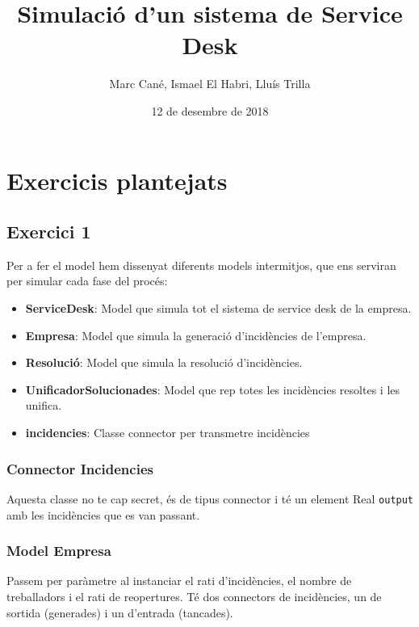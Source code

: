 \documentclass[11pt,a4paper,twoside]{report}
\begin{document}
\title{Simulació d'un sistema de Service Desk}
\author{Marc Cané, Ismael El Habri, Lluís Trilla}
\date{12 de desembre de 2018}
\maketitle

\tableofcontents

\chapter{Exercicis plantejats}

\section{Exercici 1}

Per a fer el model hem dissenyat diferents models intermitjos, que ens serviran per simular cada fase del procés:
\begin{itemize}
  \item \textbf{ServiceDesk}: Model que simula tot el sistema de service desk de la empresa.
  \item \textbf{Empresa}: Model que simula la generació d'incidències de l'empresa.
  \item \textbf{Resolució}: Model que simula la resolució d'incidències.
  \item \textbf{UnificadorSolucionades}: Model que rep totes les incidències resoltes i les unifica.
  \item \textbf{incidencies}: Classe connector per transmetre incidències 
\end{itemize}

\subsection{Connector Incidencies}



Aquesta classe no te cap secret, és de tipus connector i té un element Real \texttt{output} amb les incidències que es van passant.

\subsection{Model Empresa}


Passem per paràmetre al instanciar el rati d'incidències, el nombre de treballadors i el rati de reopertures. Té dos connectors de incidències, un de sortida (generades) i un d'entrada (tancades).
\end{document}

